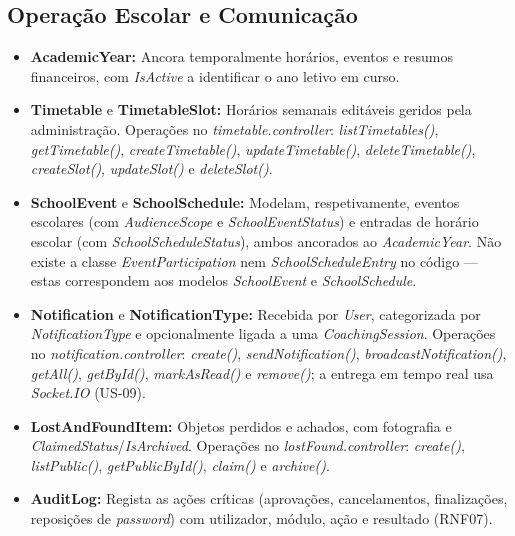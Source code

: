 \documentclass[12pt,a4paper]{report}
\begin{document}
\subsection{Operação Escolar e Comunicação}
\begin{itemize}
    \item \textbf{AcademicYear:} Ancora temporalmente horários, eventos e resumos
    financeiros, com \textit{IsActive} a identificar o ano letivo em curso.

    \item \textbf{Timetable} e \textbf{TimetableSlot:} Horários semanais editáveis
    geridos pela administração. Operações no \textit{timetable.controller}:
    \textit{listTimetables()}, \textit{getTimetable()}, \textit{createTimetable()},
    \textit{updateTimetable()}, \textit{deleteTimetable()}, \textit{createSlot()},
    \textit{updateSlot()} e \textit{deleteSlot()}.

    \item \textbf{SchoolEvent} e \textbf{SchoolSchedule:} Modelam, respetivamente,
    eventos escolares (com \textit{AudienceScope} e \textit{SchoolEventStatus}) e
    entradas de horário escolar (com \textit{SchoolScheduleStatus}), ambos ancorados
    ao \textit{AcademicYear}. Não existe a classe \textit{EventParticipation} nem
    \textit{SchoolScheduleEntry} no código --- estas correspondem aos modelos
    \textit{SchoolEvent} e \textit{SchoolSchedule}.

    \item \textbf{Notification} e \textbf{NotificationType:} Recebida por
    \textit{User}, categorizada por \textit{NotificationType} e opcionalmente ligada
    a uma \textit{CoachingSession}. Operações no \textit{notification.controller}:
    \textit{create()}, \textit{sendNotification()}, \textit{broadcastNotification()},
    \textit{getAll()}, \textit{getById()}, \textit{markAsRead()} e \textit{remove()};
    a entrega em tempo real usa \textit{Socket.IO} (US-09).

    \item \textbf{LostAndFoundItem:} Objetos perdidos e achados, com fotografia e
    \textit{ClaimedStatus}/\textit{IsArchived}. Operações no
    \textit{lostFound.controller}: \textit{create()}, \textit{listPublic()},
    \textit{getPublicById()}, \textit{claim()} e \textit{archive()}.

    \item \textbf{AuditLog:} Regista as ações críticas (aprovações, cancelamentos,
    finalizações, reposições de \textit{password}) com utilizador, módulo, ação e
    resultado (RNF07).
\end{itemize}
\end{document}
